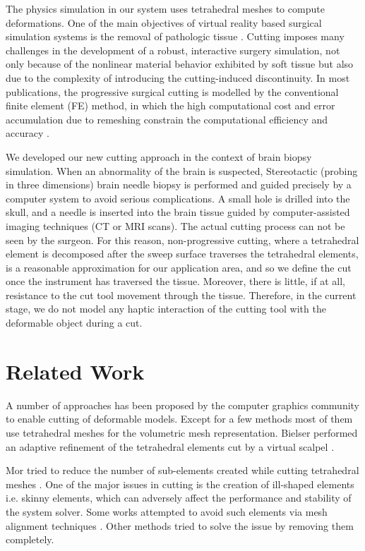 \label{chapter:Cutting}
The physics simulation in our system uses tetrahedral meshes to compute deformations.
One of the main objectives of virtual reality based surgical simulation systems is the removal of pathologic tissue 
\cite{Steinemann, Nienhuys2001a}. Cutting imposes many challenges in the development of a robust, interactive surgery 
simulation, not only because of the nonlinear material behavior exhibited by soft tissue but also due to the
complexity of introducing the cutting-induced discontinuity. In most publications, the progressive surgical cutting is modelled
by the conventional finite element (FE) method, in which the high computational cost and error accumulation due to remeshing constrain 
the computational efficiency and accuracy \cite{Steinemann, Courtecuisse2010a}. 

We developed our new cutting approach in the context of brain biopsy simulation. When an abnormality of the brain is suspected, 
Stereotactic (probing in three dimensions) brain needle biopsy is performed and guided precisely by a computer system to avoid 
serious complications. A small hole is drilled into the skull, and a needle is inserted into the brain tissue guided by computer-assisted 
imaging techniques (CT or MRI scans). The actual cutting process can not be seen by the surgeon. For this reason,
non-progressive cutting, where a tetrahedral element is decomposed after the sweep surface traverses the tetrahedral elements, is a reasonable
approximation for our application area, and so we define the cut once the instrument has traversed the tissue. 
Moreover, there is little, if at all, resistance to the cut tool movement through the tissue. Therefore, in the current stage, we do 
not model any haptic interaction of the cutting tool with the deformable object during a cut. 


\section{Related Work}
A number of approaches has been proposed by the computer graphics community to enable cutting of deformable models. 
Except for a few methods most of them use tetrahedral meshes for the volumetric mesh representation. 
Bielser \etal performed an adaptive refinement of the tetrahedral elements cut by a virtual scalpel \cite{Bielser1999}.

Mor \etal tried to reduce the number of sub-elements created while cutting tetrahedral meshes \cite{Mor2000}.
One of the major issues in cutting is the creation of ill-shaped elements i.e. skinny elements, which can adversely affect the
performance and stability of the system solver. Some works attempted to avoid such elements via mesh alignment techniques 
\cite{Nienhuys2001a, Steinemann2006}. Other methods tried to solve the issue by removing them completely.

